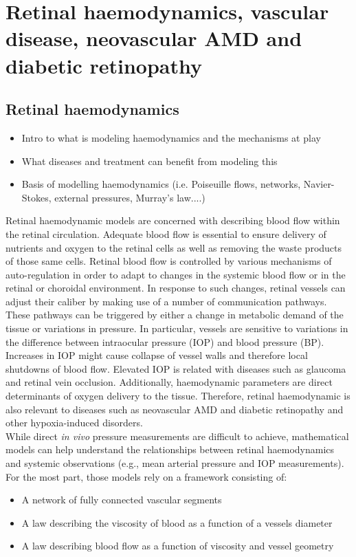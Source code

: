 \documentclass[12pt,a4paper]{article}
\begin{document}
\section{Retinal haemodynamics, vascular disease, neovascular AMD and diabetic retinopathy}

\subsection{Retinal haemodynamics}
\begin{itemize}
\item Intro to what is modeling haemodynamics and the mechanisms at play
\item What diseases and treatment can benefit from modeling this
\item Basis of modelling haemodynamics (i.e. Poiseuille flows, networks, Navier-Stokes, external pressures, Murray's law....)
\end{itemize}
Retinal haemodynamic models are concerned with describing blood flow within the retinal circulation.
Adequate blood flow is essential to ensure delivery of nutrients and oxygen to the retinal cells as well as removing the waste products of those same cells.
Retinal blood flow is controlled by various mechanisms of auto-regulation in order to adapt to changes in the systemic blood flow or in the retinal or choroidal environment.
In response to such changes, retinal vessels can adjust their caliber by making use of a number of communication pathways.
These pathways can be triggered by either a change in metabolic demand of the tissue or variations in pressure.
In particular, vessels are sensitive to variations in the difference between intraocular pressure (IOP) and blood pressure (BP).
Increases in IOP might cause collapse of vessel walls and therefore local shutdowns of blood flow.
Elevated IOP is related with diseases such as glaucoma and retinal vein occlusion. 
Additionally, haemodynamic parameters are direct determinants of oxygen delivery to the tissue.
Therefore, retinal haemodynamic is also relevant to diseases such as neovascular AMD and diabetic retinopathy and other hypoxia-induced disorders. \\
While direct \textit{in vivo} pressure measurements are difficult to achieve, mathematical models can help understand the relationships between retinal haemodynamics and systemic observations (e.g., mean arterial pressure and IOP measurements).
For the most part, those models rely on a framework consisting of:
\begin{itemize}
\item A network of fully connected vascular segments
\item A law describing the viscosity of blood as a function of a vessels diameter
\item A law describing blood flow as a function of viscosity and vessel geometry
\end{itemize}
\end{document}
